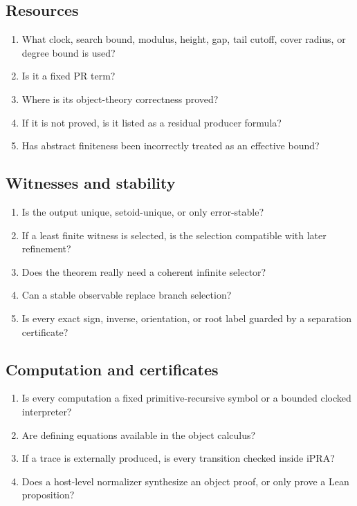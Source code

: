 \subsection*{Resources}

\begin{enumerate}
\item What clock, search bound, modulus, height, gap, tail cutoff, cover radius,
or degree bound is used?
\item Is it a fixed PR term?
\item Where is its object-theory correctness proved?
\item If it is not proved, is it listed as a residual producer formula?
\item Has abstract finiteness been incorrectly treated as an effective bound?
\end{enumerate}

\subsection*{Witnesses and stability}

\begin{enumerate}
\item Is the output unique, setoid-unique, or only error-stable?
\item If a least finite witness is selected, is the selection compatible with
later refinement?
\item Does the theorem really need a coherent infinite selector?
\item Can a stable observable replace branch selection?
\item Is every exact sign, inverse, orientation, or root label guarded by a
separation certificate?
\end{enumerate}

\subsection*{Computation and certificates}

\begin{enumerate}
\item Is every computation a fixed primitive-recursive symbol or a bounded
clocked interpreter?
\item Are defining equations available in the object calculus?
\item If a trace is externally produced, is every transition checked inside
iPRA?
\item Does a host-level normalizer synthesize an object proof, or only prove a
Lean proposition?
\end{enumerate}

